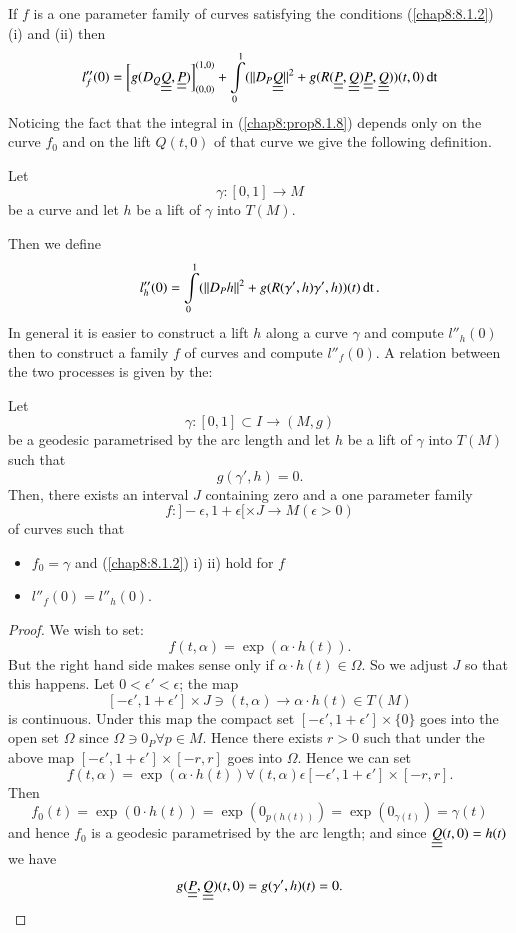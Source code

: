 \setcounter{prop}{7}
\begin{prop}\label{chap8:prop8.1.8}
If $f$ is a one parameter family of curves satisfying the conditions
(\ref{chap8:8.1.2}) {\rm (i)} and {\rm (ii)} then
$$
l''_{f}(0)=\left[g(D_{Q}\underline{\underline{Q}},\underline{\underline{P}})\right]^{(1,0)}_{(0,0)}+\int\limits^{1}_{0}(||D_{P}\underline{\underline{Q}}||^{2}+g(R(\underline{\underline{P}},\underline{\underline{Q}})\underline{\underline{P}},\underline{\underline{Q}}))(t,0)\operatorname{dt} 
$$
Noticing the fact that the integral in (\ref{chap8:prop8.1.8}) depends only
on the curve $f_{0}$ and on the lift $Q(t,0)$ of that curve we give
the following definition.
\end{prop}

\setcounter{definition}{8}
\begin{definition}\label{chap8:defi8.1.9}
Let
$$
\gamma:[0,1]\to M
$$
be a curve and let $h$ be a lift of $\gamma$ into $T(M)$.

Then we define
$$
l''_{h}(0)=\int\limits^{1}_{0}(||D_{P}h||^{2}+g(R(\gamma',h)\gamma',h))(t)\operatorname{dt}. 
$$
In \pageoriginale general it is easier to construct a lift $h$ along a
curve $\gamma$ and compute $l''_{h}(0)$ then to construct a family $f$
of curves and compute $l''_{f}(0)$. A relation between the two
processes is given by the:
\end{definition}

\setcounter{prop}{9}
\begin{prop}\label{chap8:prop8.1.10}
Let
$$
\gamma:[0,1]\subset I\to (M,g)
$$
be a geodesic parametrised by the arc length and let $h$ be a lift of
$\gamma$ into $T(M)$ such that
$$
g(\gamma',h)=0.
$$
Then, there exists an interval $J$ containing zero and a one parameter
family
$$
f:]-\epsilon, 1+\epsilon[\times J\to M(\epsilon>0)
$$
of curves such that
\begin{itemize}
\item[\rm a)] $f_{0}=\gamma$ and (\ref{chap8:8.1.2}) {\rm i) ii)} hold for
  $f$

\item[\rm b)] $l''_{f}(0)=l''_{h}(0)$.
\end{itemize}
\end{prop}

\begin{proof}
We wish to set:
$$
f(t,\alpha)=\exp(\alpha\cdot h(t)).
$$
But the right hand side makes sense only if $\alpha\cdot h(t)\in
\Omega$. So we adjust $J$ so that this happens. Let
$0<\epsilon'<\epsilon$; the map
$$
[-\epsilon',1+\epsilon']\times J\ni (t,\alpha)\to \alpha\cdot h(t)\in T(M)
$$
is continuous. Under this map the compact set $[-\epsilon',
  1+\epsilon']\times\{0\}$ goes into the open set $\Omega$ since
$\Omega\ni 0_{P}\forall p\in M$. Hence there exists $r>0$ such that
under the above map $[-\epsilon',1+\epsilon']\times[-r,r]$ goes into
$\Omega$. Hence we can set
$$
f(t,\alpha)=\exp(\alpha\cdot h(t))\forall
(t,\alpha)\epsilon[-\epsilon',1+\epsilon']\times[-r,r]. 
$$
Then\pageoriginale
$$
f_{0}(t)=\exp(0\cdot
h(t))=\exp(0_{p(h(t))})=\exp(0_{\gamma(t)})=\gamma(t)
$$
and hence $f_{0}$ is a geodesic parametrised by the arc length; and
since $\underline{\underline{Q}}(t,0)=h(t)$ we have
$$
g(\underline{\underline{P}},\underline{\underline{Q}})(t,0)=g(\gamma',h)(t)=0.
$$
\end{proof}

